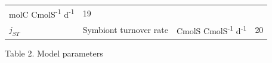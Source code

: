 \documentclass[]{elsarticle} %
\begin{document}
\begin{longtable}[c]{@{}llll@{}}
\begin{minipage}[t]{0.26\columnwidth}\raggedright\strut
molC CmolS\textsuperscript{-1} d\textsuperscript{-1}
\strut\end{minipage} &
\begin{minipage}[t]{0.10\columnwidth}\raggedright\strut
19
\strut\end{minipage}\tabularnewline
\begin{minipage}[t]{0.12\columnwidth}\raggedright\strut
\(j_{ST}\)
\strut\end{minipage} &
\begin{minipage}[t]{0.48\columnwidth}\raggedright\strut
Symbiont turnover rate
\strut\end{minipage} &
\begin{minipage}[t]{0.26\columnwidth}\raggedright\strut
CmolS CmolS\textsuperscript{-1} d\textsuperscript{-1}
\strut\end{minipage} &
\begin{minipage}[t]{0.10\columnwidth}\raggedright\strut
20
\strut\end{minipage}\tabularnewline
\bottomrule
\end{longtable}

Table 2. Model parameters
\end{document}
